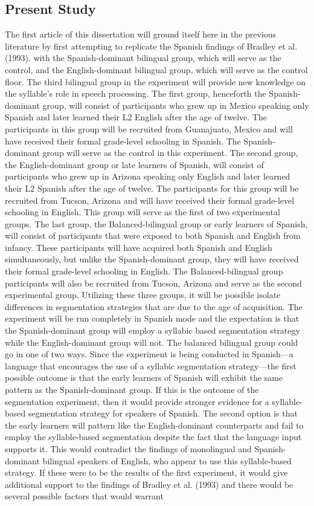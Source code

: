 \subsection{Present Study}
The first article of this dissertation will ground itself here in the previous literature by first attempting to replicate the Spanish findings of Bradley et al. (1993). with the Spanish-dominant bilingual group, which will serve as the control, and the English-dominant bilingual group, which will serve as the control floor. The third bilingual group in the experiment will provide new knowledge on the syllable’s role in speech processing.  The first group, henceforth the Spanish-dominant group, will consist of participants who grew up in Mexico speaking only Spanish and later learned their L2 English after the age of twelve. The participants in this group will be recruited from Guanajuato, Mexico and will have received their formal grade-level schooling in Spanish. The Spanish-dominant group will serve as the control in this experiment. The second group, the English-dominant group or late learners of Spanish, will consist of participants who grew up in Arizona speaking only English and later learned their L2 Spanish after the age of twelve. The participants for this group will be recruited from Tucson, Arizona and will have received their formal grade-level schooling in English. This group will serve as the first of two experimental groups. The last group, the Balanced-bilingual group or early learners of Spanish, will consist of participants that were exposed to both Spanish and English from infancy. These participants will have acquired both Spanish and English simultaneously, but unlike the Spanish-dominant group, they will have received their formal grade-level schooling in English. The Balanced-bilingual group participants will also be recruited from Tucson, Arizona and serve as the second experimental group. Utilizing these three groups, it will be possible isolate differences in segmentation strategies that are due to the age of acquisition. The experiment will be run completely in Spanish mode and the expectation is that the Spanish-dominant group will employ a syllabic based segmentation strategy while the English-dominant group will not. The balanced bilingual group could go in one of two ways. Since the experiment is being conducted in Spanish—a language that encourages the use of a syllabic segmentation strategy—the first possible outcome is that the early learners of Spanish will exhibit the same pattern as the Spanish-dominant group. If this is the outcome of the segmentation experiment, then it would provide stronger evidence for a syllable-based segmentation strategy for speakers of Spanish. The second option is that the early learners will pattern like the English-dominant counterparts and fail to employ the syllable-based segmentation despite the fact that the language input supports it. This would contradict the findings of monolingual and Spanish-dominant bilingual speakers of English, who appear to use this syllable-based strategy. If these were to be the results of the first experiment, it would give additional support to the findings of Bradley et al. (1993) and there would be several possible factors that would warrant 
